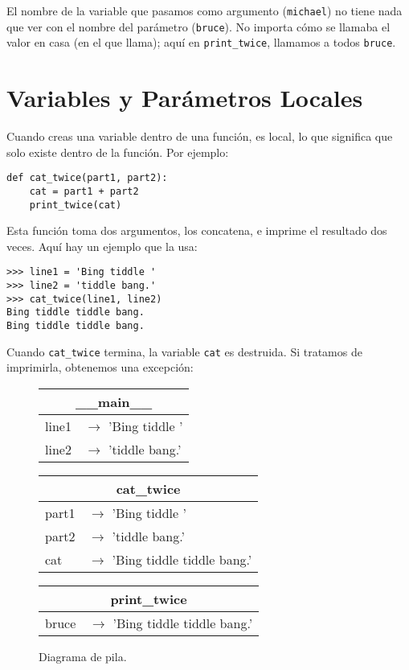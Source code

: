 \documentclass[12pt,letterpaper]{book}
\begin{document}
El nombre de la variable que pasamos como argumento (\texttt{michael}) no tiene nada que ver con el nombre del parámetro (\texttt{bruce}). No importa cómo se llamaba el valor en casa (en el que llama); aquí en \texttt{print\_twice}, llamamos a todos \texttt{bruce}.

\section{Variables y Parámetros Locales}

Cuando creas una variable dentro de una función, es local, lo que significa que solo existe dentro de la función. Por ejemplo:

\begin{lstlisting}
def cat_twice(part1, part2):
    cat = part1 + part2
    print_twice(cat)
\end{lstlisting}

Esta función toma dos argumentos, los concatena, e imprime el resultado dos veces. Aquí hay un ejemplo que la usa:

\begin{lstlisting}
>>> line1 = 'Bing tiddle '
>>> line2 = 'tiddle bang.'
>>> cat_twice(line1, line2)
Bing tiddle tiddle bang.
Bing tiddle tiddle bang.
\end{lstlisting}

Cuando \texttt{cat\_twice} termina, la variable \texttt{cat} es destruida. Si tratamos de imprimirla, obtenemos una excepción:

\begin{figure}[h]
\centering
\begin{tabular}{|l|l|}
\hline
\multicolumn{2}{|c|}{\textbf{\_\_main\_\_}} \\
\hline
line1 & $\longrightarrow$ 'Bing tiddle ' \\
line2 & $\longrightarrow$ 'tiddle bang.' \\
\hline
\end{tabular}

\vspace{0.5cm}

\begin{tabular}{|l|l|}
\hline
\multicolumn{2}{|c|}{\textbf{cat\_twice}} \\
\hline
part1 & $\longrightarrow$ 'Bing tiddle ' \\
part2 & $\longrightarrow$ 'tiddle bang.' \\
cat & $\longrightarrow$ 'Bing tiddle tiddle bang.' \\
\hline
\end{tabular}

\vspace{0.5cm}

\begin{tabular}{|l|l|}
\hline
\multicolumn{2}{|c|}{\textbf{print\_twice}} \\
\hline
bruce & $\longrightarrow$ 'Bing tiddle tiddle bang.' \\
\hline
\end{tabular}

\caption{Diagrama de pila.}
\label{fig:stack_diagram}
\end{figure}
\end{document}
